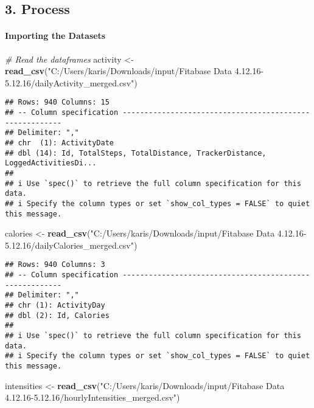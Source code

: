 \documentclass[
]{article}
\newenvironment{Shaded}{\begin{snugshade}}{\end{snugshade}}
\newcommand{\CommentTok}[1]{\textcolor[rgb]{0.56,0.35,0.01}{\textit{#1}}}
\newcommand{\FunctionTok}[1]{\textcolor[rgb]{0.13,0.29,0.53}{\textbf{#1}}}
\newcommand{\NormalTok}[1]{#1}
\newcommand{\OtherTok}[1]{\textcolor[rgb]{0.56,0.35,0.01}{#1}}
\newcommand{\StringTok}[1]{\textcolor[rgb]{0.31,0.60,0.02}{#1}}
\begin{document}
\hypertarget{process}{%
\subsection{3. Process}\label{process}}

\hypertarget{importing-the-datasets}{%
\paragraph{Importing the Datasets}\label{importing-the-datasets}}

\begin{Shaded}
\begin{Highlighting}[]
\CommentTok{\# Read the dataframes}
\NormalTok{activity }\OtherTok{\textless{}{-}} \FunctionTok{read\_csv}\NormalTok{(}\StringTok{"C:/Users/karis/Downloads/input/Fitabase Data 4.12.16{-}5.12.16/dailyActivity\_merged.csv"}\NormalTok{)}
\end{Highlighting}
\end{Shaded}

\begin{verbatim}
## Rows: 940 Columns: 15
## -- Column specification --------------------------------------------------------
## Delimiter: ","
## chr  (1): ActivityDate
## dbl (14): Id, TotalSteps, TotalDistance, TrackerDistance, LoggedActivitiesDi...
## 
## i Use `spec()` to retrieve the full column specification for this data.
## i Specify the column types or set `show_col_types = FALSE` to quiet this message.
\end{verbatim}

\begin{Shaded}
\begin{Highlighting}[]
\NormalTok{calories }\OtherTok{\textless{}{-}} \FunctionTok{read\_csv}\NormalTok{(}\StringTok{"C:/Users/karis/Downloads/input/Fitabase Data 4.12.16{-}5.12.16/dailyCalories\_merged.csv"}\NormalTok{)}
\end{Highlighting}
\end{Shaded}

\begin{verbatim}
## Rows: 940 Columns: 3
## -- Column specification --------------------------------------------------------
## Delimiter: ","
## chr (1): ActivityDay
## dbl (2): Id, Calories
## 
## i Use `spec()` to retrieve the full column specification for this data.
## i Specify the column types or set `show_col_types = FALSE` to quiet this message.
\end{verbatim}

\begin{Shaded}
\begin{Highlighting}[]
\NormalTok{intensities }\OtherTok{\textless{}{-}} \FunctionTok{read\_csv}\NormalTok{(}\StringTok{"C:/Users/karis/Downloads/input/Fitabase Data 4.12.16{-}5.12.16/hourlyIntensities\_merged.csv"}\NormalTok{)}
\end{Highlighting}
\end{Shaded}
\end{document}
